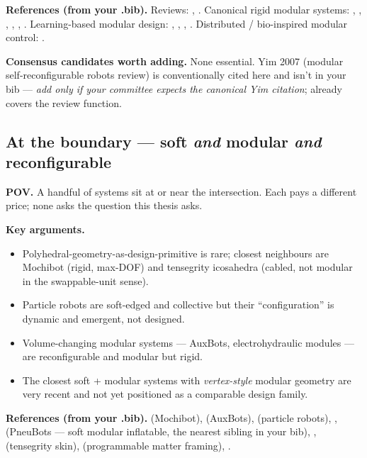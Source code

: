 \textbf{References (from your .bib).}
Reviews: \cite{ahmadzadehModularRoboticSystems2015},
\cite{liangModularReconfigurableRobots2026}.
Canonical rigid modular systems:
\cite{romanishinMBlocksThreeDimensional2018},
\cite{rubensteinProgrammableSelfassemblyThousandrobot2014},
\cite{tuFreeSNFreeformStrutnode2022},
\cite{yiReconfigurableRobotControl2023},
\cite{yiImprovingRobotCapabilities},
\cite{chinFunctionFollowsForm2023}.
Learning-based modular design:
\cite{whitmanLearningModularRobot2023},
\cite{huModularRobotDesign2022},
\cite{38942241ModularMobile},
\cite{AgileLeggedLocomotion}.
Distributed / bio-inspired modular control:
\cite{zhangBioInspiredDistributedNeural}.

\textbf{Consensus candidates worth adding.} None essential. Yim 2007
(modular self-reconfigurable robots review) is conventionally cited
here and isn't in your bib --- \emph{add only if your committee
expects the canonical Yim citation}; \cite{ahmadzadehModularRoboticSystems2015}
already covers the review function.

\subsection{At the boundary --- soft \emph{and} modular \emph{and} reconfigurable}
\label{subsec:boundary}

\textbf{POV.} A handful of systems sit at or near the intersection.
Each pays a different price; none asks the question this thesis
asks.

\textbf{Key arguments.}
\begin{itemize}
    \item Polyhedral-geometry-as-design-primitive is rare; closest
          neighbours are Mochibot (rigid, max-DOF) and tensegrity
          icosahedra (cabled, not modular in the swappable-unit sense).
    \item Particle robots are soft-edged and collective but their
          ``configuration'' is dynamic and emergent, not designed.
    \item Volume-changing modular systems --- AuxBots, electrohydraulic
          modules --- are reconfigurable and modular but rigid.
    \item The closest soft + modular systems with \emph{vertex-style}
          modular geometry are very recent and not yet positioned as
          a comparable design family.
\end{itemize}

\textbf{References (from your .bib).}
\cite{nozakiContinuousShapeChanging2018} (Mochibot),
\cite{chinFlipperStyleLocomotionStrong2023} (AuxBots),
\cite{liParticleRoboticsBased2019} (particle robots),
\cite{wangRoboMatterReconfigurableMultifunctional2024},
\cite{younPneuBotsModularInflatables2022} (PneuBots --- soft modular
inflatable, the nearest sibling in your bib),
\cite{yoderHexagonalElectrohydraulicModules2024},
\cite{boothSurfaceActuationSensing2021} (tensegrity skin),
\cite{tibbitsThingsFallTogether2021} (programmable matter framing),
\cite{suzukiShapeBotsShapechangingSwarm2019}.

